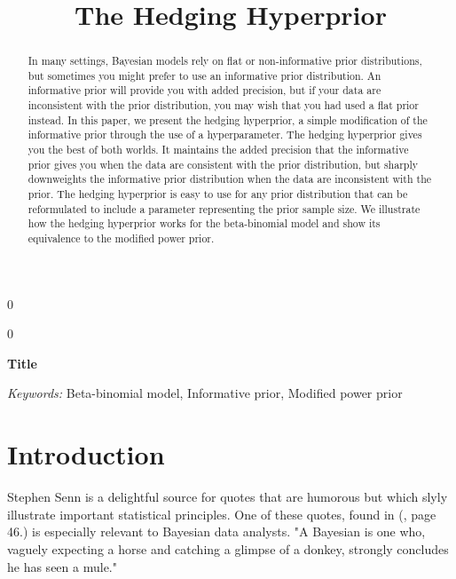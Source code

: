 \documentclass[12pt]{article}
\newcommand{\blind}{0}
\begin{document}
%

\def\spacingset#1{\renewcommand{\baselinestretch}%
{#1}\small\normalsize} \spacingset{1}



\blind
{
  \title{\bf The Hedging Hyperprior}
  \maketitle
} \fi

\blind
{
  \bigskip
  \bigskip
  \bigskip
  \begin{center}
    {\LARGE\bf Title}
\end{center}
  \medskip
} \fi

\bigskip
\begin{abstract}
In many settings, Bayesian models rely on flat or non-informative prior distributions, but sometimes you might prefer to use an informative prior distribution. An informative prior will provide you with added precision, but if your data are inconsistent with the prior distribution, you may wish that you had used a flat prior instead. In this paper, we present the hedging hyperprior, a simple modification of the informative prior through the use of a hyperparameter. The hedging hyperprior gives you the best of both worlds. It maintains the added precision that the informative prior gives you when the data are consistent with the prior distribution, but sharply downweights the informative prior distribution when the data are inconsistent with the prior. The hedging hyperprior is easy to use for any prior distribution that can be reformulated to include a parameter representing the prior sample size. We illustrate how the hedging hyperprior works for the beta-binomial model and show its equivalence to the modified power prior.
\end{abstract}

\noindent%
{\it Keywords:}  Beta-binomial model, Informative prior, Modified power prior
\vfill

\newpage
\spacingset{1.45} %
\section{Introduction}
\label{sec:intro}

Stephen Senn is a delightful source for quotes that are humorous but which slyly illustrate important statistical principles. One of these quotes, found in (\cite{senn08}, page 46.) is especially relevant to Bayesian data analysts. "A Bayesian is one who, vaguely expecting a horse and catching a glimpse of a donkey, strongly concludes he has seen a mule." 
\end{document}
